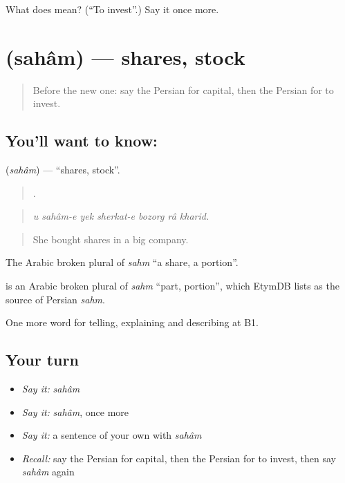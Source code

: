 \begin{tcolorbox}[breakable,colback=teal!4,colframe=teal!35!black,title={Before you move on}]
What does    mean? (\textquotedblleft{}To invest\textquotedblright{}.) Say it once more.
\end{tcolorbox}
\section[\texorpdfstring{\fa{سهام} (sahâm)}{سهام (sahâm)}]{ (sahâm) — shares, stock}

\label{lesson:FA-C412-saham}



\begin{quote}
Before the new one: say the Persian for capital, then the Persian for to invest.
\end{quote}

\subsection*{You'll want to know: }
\textbf{} (\emph{sahâm}) — \textquotedblleft{}shares, stock\textquotedblright{}.

\begin{quote}
      .
\end{quote}

\begin{quote}
\emph{u sahâm-e yek sherkat-e bozorg râ kharid.}
\end{quote}

\begin{quote}
She bought shares in a big company.
\end{quote}

The Arabic broken plural of \emph{sahm} \textquotedblleft{}a share, a portion\textquotedblright{}.

\begin{cousinweb}
\textbf{} is an Arabic broken plural of \emph{sahm} \textquotedblleft{}part, portion\textquotedblright{}, which EtymDB lists as the source of Persian \emph{sahm}.
\end{cousinweb}

\begin{grammarlens}[title={What you've built}]
One more word for telling, explaining and describing at B1.
\end{grammarlens}

\subsection*{Your turn}
\begin{itemize}
\raggedright
  \item \emph{Say it:} \emph{sahâm}
  \item \emph{Say it:} \emph{sahâm}, once more
  \item \emph{Say it:} a sentence of your own with \emph{sahâm}
  \item \emph{Recall:} say the Persian for capital, then the Persian for to invest, then say \emph{sahâm} again
\end{itemize}

